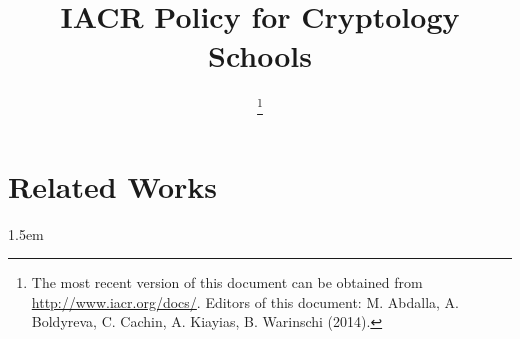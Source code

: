 \documentclass[11pt]{article}
\title{\bf IACR Policy for Cryptology Schools}
\author{\mbox{}}
\date{\lastupdate
 \footnote{The most recent version of this document
    can be obtained from \protect\url{http://www.iacr.org/docs/}.\newline
  Editors of this document: M. Abdalla, A. Boldyreva, C. Cachin, A. Kiayias, B. Warinschi (2014).}}
\begin{document}
\pagestyle{fancy}

\maketitle

\section{Related Works}








\emergencystretch 1.5em

\end{document}
